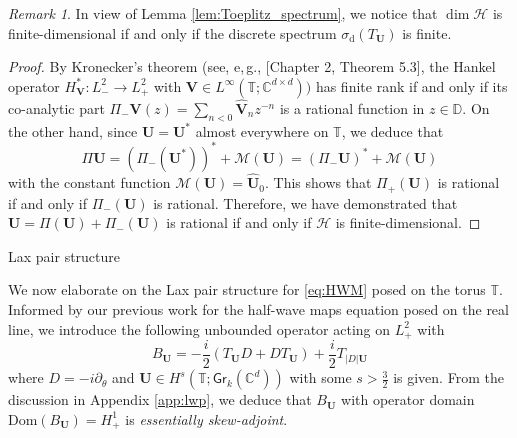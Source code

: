 \documentclass[10pt,reqno,a4paper]{amsart}
\makeatletter
\theoremstyle{definition}
\theoremstyle{remark}
\theoremstyle{remark}
\newtheorem*{remark*}{Remark}
\numberwithin{equation}{section}
\newcommand{\C}{\mathbb{C}}
\newcommand{\T}{\mathbb{T}}
\newcommand{\D}{\mathbb{D}}
\newcommand{\Mean}{\mathscr{M}}
\newcommand{\dom}{\mathrm{Dom}}
\newcommand{\pt}{\partial}
\newcommand{\Cd}{\mathbb{C}^{d \times d}}
\newcommand{\be}{\begin{equation}}
\newcommand{\ee}{\end{equation}}
\newcommand{\Vb}{\mathbf{V}}
\newcommand{\Ub}{\mathbf{U}}
\newcommand{\Gr}{\mathsf{Gr}}
\newcommand{\sd}{\sigma_{\mathrm{d}}}
\newcommand{\Hs}{\mathscr{H}}
\def\section{\@startsection{section}{1}%
  \z@{1.5\linespacing\@plus\linespacing}{.5\linespacing}%
  {\normalfont\bfseries\large\centering}}
\makeatother
\begin{document}
\begin{remark*}
In view of Lemma \ref{lem:Toeplitz_spectrum}, we notice that $\dim \Hs$ is finite-dimensional if and only if the discrete spectrum $\sd(T_\Ub)$ is finite. 
\end{remark*}

\begin{proof}
By Kronecker's theorem (see, e,\,g., \cite{Pe-03}[Chapter 2, Theorem 5.3], the  Hankel operator $H^*_{\Vb} : L^2_- \to L^2_+$ with $\Vb \in L^\infty(\T; \Cd))$ has finite rank if and only if its co-analytic part $\Pi_- \Vb(z) = \sum_{n<0} \widehat{\Vb}_n z^{-n}$ is a rational function in $z \in \D$.  On the other hand, since $\Ub = \Ub^*$ almost everywhere on $\T$, we deduce that 
$$
\Pi \Ub = (\Pi_-(\Ub^*)) ^*+ \Mean(\Ub) = (\Pi_- \Ub)^* + \Mean(\Ub)
$$ 
with the constant function $\Mean(\Ub) = \widehat{\Ub}_0$. This shows that $\Pi_+(\Ub)$ is rational  if and only if $\Pi_-(\Ub)$ is rational. Therefore, we have demonstrated that $\Ub = \Pi(\Ub)+ \Pi_-(\Ub)$ is rational if and only if $\Hs$ is finite-dimensional.
\end{proof}


\section{Lax pair structure}

\label{sec:lax}

We now elaborate on the Lax pair structure for \eqref{eq:HWM} posed on the torus $\T$. Informed by our previous work \cite{GeLe-25} for the half-wave maps equation posed on the real line, we introduce the following unbounded operator acting on $L^2_+$ with
\be
B_\Ub = -\frac{i}{2} ( T_\Ub  D + D  T_\Ub) + \frac{i}{2} T_{|D| \Ub}
\ee
where $D=-i \pt_\theta$ and $\Ub \in H^{s}(\T; \Gr_k(\C^d))$ with some $s> \frac{3}{2}$ is given. From the discussion in Appendix \ref{app:lwp}, we deduce that $B_\Ub$ with operator domain $\dom( B_\Ub) = H^1_+$ is {\em essentially skew-adjoint}.
\end{document}
